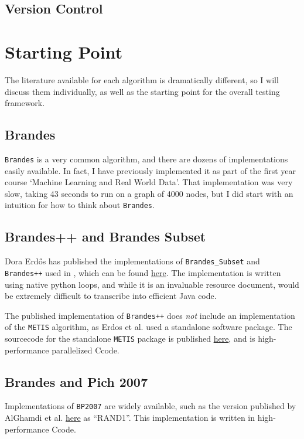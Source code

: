 \documentclass[12pt,a4paper,twoside,openright]{report}
\newcommand{\CC}{C\nolinebreak\hspace{-.05em}\raisebox{.4ex}{\tiny\bf +}\nolinebreak\hspace{-.10em}\raisebox{.4ex}{\tiny\bf +}} %
\newcommand{\ttt}[1]{\texttt{#1}}
\newcommand{\erdos}{Erd\H{o}s }
\begin{document}
	\subsection{Version Control}
\section{Starting Point}
The literature available for each algorithm is dramatically different, so I will discuss them individually, as well as the starting point for the overall testing framework.

\subsection{Brandes}
	\ttt{Brandes} is a very common algorithm, and there are dozens of implementations easily available. In fact, I have previously implemented it as part of the first year course `Machine Learning and Real World Data'. That implementation was very slow, taking 43 seconds to run on a graph of 4000 nodes, but I did start with an intuition for how to think about \ttt{Brandes}.

\subsection{Brandes++ and Brandes Subset}

	Dora \erdos has published the implementations of \ttt{Brandes\_Subset} and \ttt{Brandes++} used in \cite{erdos}, which can be found \href{https://cs-people.bu.edu/edori/code.html#Betweenness_centrality}{here}. The implementation is written using native python loops, and while it is an invaluable resource document, would be extremely difficult to transcribe into efficient Java code.
	
	The published implementation of \ttt{Brandes++} does \textit{not} include an implementation of the \ttt{METIS} algorithm, as Erdos et al. used a standalone software package. The sourcecode for the standalone \ttt{METIS} package is published \href{https://github.com/KarypisLab/METIS}{here}, and is high-performance parallelized \CC code. 

\subsection{Brandes and Pich 2007}

Implementations of \ttt{BP2007} are widely available, such as the version published by AlGhamdi et al. \cite{comparebig} \href{https://github.com/ecrc/BeBeCA/blob/master/Source_Code/src/_bc.cc}{here} as ``RAND1''. This implementation is written in high-performance \CC code.
\end{document}
